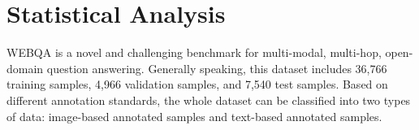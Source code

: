 \documentclass[nohyperref]{article}
\theoremstyle{plain}
\theoremstyle{definition}
\theoremstyle{remark}
\begin{document}






    \section{Statistical Analysis}\label{intro}

    WEBQA \cite{webqa} is a novel and challenging benchmark for multi-modal, multi-hop, open-domain question answering. Generally speaking, this dataset includes 36,766 training samples,  4,966 validation samples, and 7,540 test samples. Based on different annotation standards, the whole dataset can be classified into two types of data: image-based annotated samples and text-based annotated samples.
\end{document}
